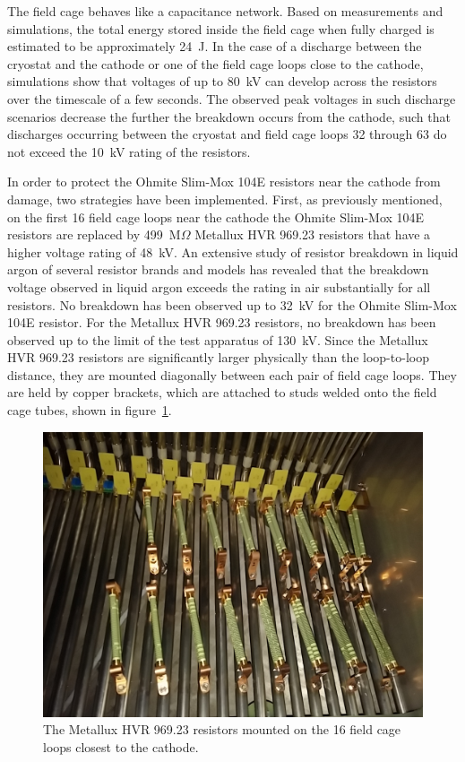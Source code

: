The field cage behaves like a capacitance network. Based on measurements and simulations, the total energy stored inside the field cage when fully charged is estimated to be approximately 24~J. In the case of a discharge between the cryostat and the cathode or one of the field cage loops close to the cathode, simulations show that voltages of up to 80~kV can develop across the resistors over the timescale of a few seconds. The observed peak voltages in such discharge scenarios decrease the further the breakdown occurs from the cathode, such that discharges occurring between the cryostat and field cage loops 32 through 63 do not exceed the 10~kV rating of the resistors.

In order to protect the Ohmite Slim-Mox 104E resistors near the cathode from damage, two strategies have been implemented.  First, as previously mentioned, on the first 16 field cage loops near the cathode the Ohmite Slim-Mox 104E resistors are replaced by 499~M$\Omega$ Metallux HVR 969.23 resistors that have a higher voltage rating of 48~kV. An extensive study of resistor breakdown in liquid argon of several resistor brands and models \cite{Bagby:2014wva} has revealed that the breakdown voltage observed in liquid argon exceeds the rating in air substantially for all resistors. No breakdown has been observed up to 32~kV for the Ohmite Slim-Mox 104E resistor. For the Metallux HVR 969.23 resistors, no breakdown has been observed up to the limit of the test apparatus of 130~kV.  Since the Metallux HVR 969.23 resistors are significantly larger physically than the loop-to-loop distance, they are mounted diagonally between each pair of field cage loops. They are held by copper brackets, which are attached to studs welded onto the field cage tubes, shown in figure~\ref{fig:tpc-voltage-divider-metallux}.

\begin{figure}[htb]
\centering	
\includegraphics[width=0.8\linewidth]{figures/tpc-voltage-divider-metallux.jpg}
\caption{The Metallux HVR 969.23 resistors mounted on the 16 field cage loops closest to the cathode.}
\label{fig:tpc-voltage-divider-metallux}
\end{figure}


